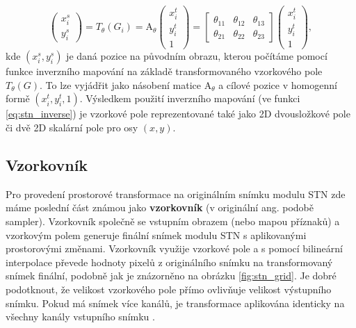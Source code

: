\begin{equation}
\begin{pmatrix}
x_i^s \\
y_i^s
\end{pmatrix}
= T_{\theta}(G_i) = {\displaystyle \mathrm {A} }_\theta
\begin{pmatrix}
x_i^t \\
y_i^t \\
1
\end{pmatrix}
= 
\begin{bmatrix}
\theta_{11} & \theta_{12} & \theta_{13} \\
\theta_{21} & \theta_{22} & \theta_{23}
\end{bmatrix}
\begin{pmatrix}
x_i^t \\
y_i^t \\
1
\end{pmatrix},
\label{eq:stn_inverse}
\end{equation}
kde $(x_i^s, y_i^s)$ je daná pozice na původním obrazu, kterou počítáme pomocí funkce inverzního mapování na základě transformovaného vzorkového pole $T_{\theta}(G)$. To lze vyjádřit jako násobení matice ${\displaystyle \mathrm {A} }_\theta$ a cílové pozice v homogenní formě $(x_i^t, y_i^t, 1)$. Výsledkem použití inverzního mapování (ve funkci \ref{eq:stn_inverse}) je vzorkové pole reprezentované také jako 2D dvousložkové pole či dvě 2D skalární pole pro osy $(x, y)$.

\subsection{Vzorkovník}

Pro provedení prostorové transformace na originálním snímku modulu STN zde máme poslední část známou jako \textbf{vzorkovník} (v originální ang. podobě sampler). Vzorkovník společně se vstupním obrazem (nebo mapou příznaků) a vzorkovým polem generuje finální snímek modulu STN s aplikovanými prostorovými změnami. Vzorkovník využije vzorkové pole a s pomocí bilineární interpolace převede hodnoty pixelů z originálního snímku na transformovaný snímek finální, podobně jak je znázorněno na obrázku \ref{fig:stn_grid}. Je dobré podotknout, že velikost vzorkového pole přímo ovlivňuje velikost výstupního snímku. Pokud má snímek více kanálů, je transformace aplikována identicky na všechny kanály vstupního snímku \cite{stn_medium_3}.

